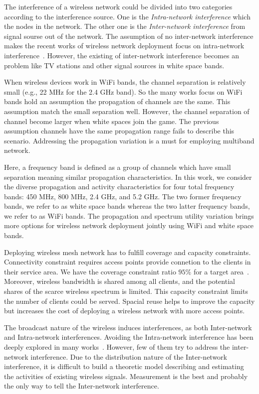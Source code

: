 The interference of a wireless network could be divided into two categories according
 to the interference source.  One is the {\it Intra-network interference} which 
 the nodes in the network. The other one is the {\it Inter-network interference}
 from signal sourse out of the network. 
The assumption of no inter-network interference makes the recent works of wireless 
network deployment focus on intra-network interference~\cite{si2010overview}. 
However, the existing of inter-network interference becomes an problem 
like TV stations and other signal sources in white space bands.


When wireless devices work in WiFi bands, the channel separation is relatively 
small (e.g., 22 MHz for the 2.4 GHz band). So the many works focus on WiFi bands 
hold an assumption the propagation of channels are the same. This assumption 
match the small separation well. However, the channel separation of channel 
become larger when white spaces join the game. The previous assumption channels have
the same propagation range fails to describe this scenario. Addressing 
the propagation variation is a must for employing multiband network.

Here, a frequency band is defined as a group of channels which have
small separation meaning similar propagation characteristics.
In this work, we consider the diverse propagation and activity characteristics
for four total frequency bands: 450 MHz, 800 MHz, 2.4 GHz, and 5.2 GHz.
The two former frequency bands, we refer to as white space bands whereas
the two latter frequency bands, we refer to as WiFi bands.
The propagation and spectrum utility variation brings 
more options for wireless network deployment jointly using WiFi and white space bands.

Deploying wireless mesh network has to fulfill coverage and capacity constraints. 
Connectivity constraint requires access points provide connetion to the clients in their service area.
We have the coverage constraint ratio $95\%$ for a target area~\cite{robinson2010deploying}. 
Moreover, wireless bandwidth is shared among all clients,
and the potential shares of the scarce wireless spectrum is limited.
This capacity constraint limits the number of clients could be served. 
Spacial reuse helps to improve the capacity but increases the cost of deploying a wireless 
network with more access points.  

The broadcast nature of the wireless induces interferences, 
as both Inter-network and Intra-network interferences. 
Avoiding the Intra-network interference has been deeply explored in 
many works~\cite{subramanian2008minimum,ramachandran2006interference,si2010overview}.
However, few of them try to address the inter-network interference.
Due to the distribution nature of the Inter-network interference,
it is difficult to build a theoretic model describing and estimating the activities of existing
wireless signals. Measurement is the best and probably the only way 
 to tell the Inter-network interference. 



